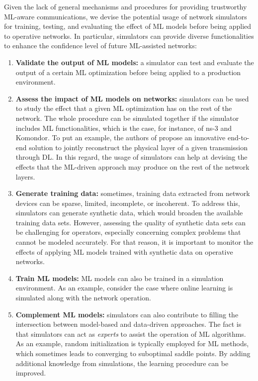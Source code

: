 \documentclass[journal]{IEEEtran}
\begin{document}
	Given the lack of general mechanisms and procedures for providing trustworthy ML-aware communications, we devise the potential usage of network simulators for training, testing, and evaluating the effect of ML models before being applied to operative networks. In particular, simulators can provide diverse functionalities to enhance the confidence level of future ML-assisted networks: 
	\begin{enumerate}
		\item \textbf{Validate the output of ML models:} a simulator can test and evaluate the output of a certain ML optimization before being applied to a production environment. 
		\item \textbf{Assess the impact of ML models on networks:} simulators can be used to study the effect that a given ML optimization has on the rest of the network. The whole procedure can be simulated together if the simulator includes ML functionalities, which is the case, for instance, of ns-3 and Komondor. To put an example, the authors of \cite{survey6} propose an innovative end-to-end solution to jointly reconstruct the physical layer of a given transmission through DL. In this regard, the usage of simulators can help at devising the effects that the ML-driven approach may produce on the rest of the network layers.	
		\item \textbf{Generate training data:} sometimes, training data extracted from network devices can be sparse, limited, incomplete, or incoherent. To address this, simulators can generate synthetic data, which would broaden the available training data sets. However, assessing the quality of synthetic data sets can be challenging for operators, especially concerning complex problems that cannot be modeled accurately. For that reason, it is important to monitor the effects of applying ML models trained with synthetic data on operative networks.
		\item \textbf{Train ML models:} ML models can also be trained in a simulation environment. As an example, consider the case where online learning is simulated along with the network operation. 
		\item \textbf{Complement ML models:} simulators can also contribute to filling the intersection between model-based and data-driven approaches. The fact is that simulators can act as \textit{experts} to assist the operation of ML algorithms. As an example, random initialization is typically employed for ML methods, which sometimes leads to converging to suboptimal saddle points. By adding additional knowledge from simulations, the learning procedure can be improved.
	\end{enumerate}
	
\end{document}
